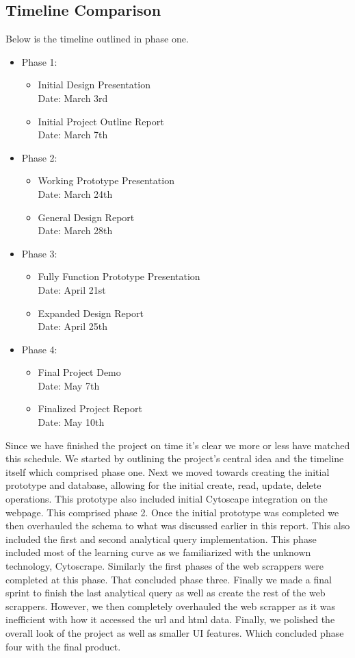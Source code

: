 \documentclass[sigconf]{acmart}
\begin{document}
\subsection{Timeline Comparison}
Below is the timeline outlined in phase one.
\begin{itemize}
    \item Phase 1: 
    \begin{itemize}
        \item Initial Design Presentation\\Date: March 3rd
        \item Initial Project Outline Report\\Date: March 7th
    \end{itemize}
    \item Phase 2: 
    \begin{itemize}
        \item Working Prototype Presentation\\Date: March 24th
        \item General Design Report\\Date: March 28th
    \end{itemize}
    \item Phase 3:
    \begin{itemize}
        \item Fully Function Prototype Presentation\\Date: April 21st
        \item Expanded Design Report\\Date: April 25th
    \end{itemize}
    \item Phase 4:
    \begin{itemize}
        \item Final Project Demo\\Date: May 7th
        \item Finalized Project Report\\Date: May 10th
    \end{itemize}
\end{itemize}
Since we have finished the project on time it's clear we more or less have matched this schedule. We started by outlining the project's central idea and the timeline itself which comprised phase one. Next we moved towards creating the initial prototype and database, allowing for the initial create, read, update, delete operations. This prototype also included initial Cytoscape integration on the webpage. This comprised phase 2. Once the initial prototype was completed we then overhauled the schema to what was discussed earlier in this report. This also included the first and second analytical query implementation. This phase included most of the learning curve as we familiarized with the unknown technology, Cytoscrape. Similarly the first phases of the web scrappers were completed at this phase. That concluded phase three. Finally we made a final sprint to finish the last analytical query as well as create the rest of the web scrappers. However, we then completely overhauled the web scrapper as it was inefficient with how it accessed the url and html data. Finally, we polished the overall look of the project as well as smaller UI features. Which concluded phase four with the final product.
\end{document}
